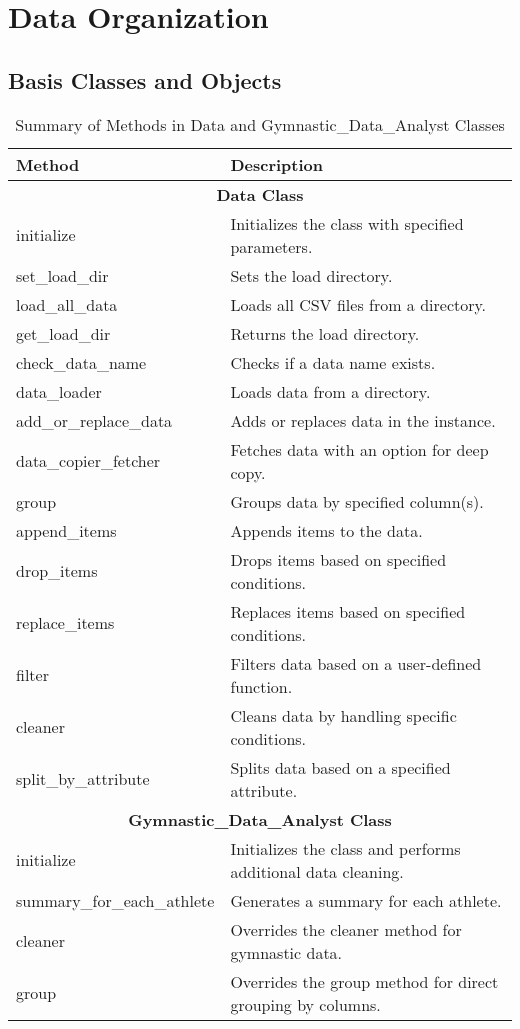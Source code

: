 \documentclass{article}
\theoremstyle{roman}
\begin{document}
\section{Data Organization}
\subsection{Basis Classes and Objects}
\begin{table}[h]
  \centering
  \begin{tabularx}{\textwidth}{lX}
    \toprule
    \textbf{Method} & \textbf{Description} \\
    \midrule
    \multicolumn{2}{c}{\textbf{Data Class}} \\
    \midrule
    initialize & Initializes the class with specified parameters. \\
    set\_load\_dir & Sets the load directory. \\
    load\_all\_data & Loads all CSV files from a directory. \\
    get\_load\_dir & Returns the load directory. \\
    check\_data\_name & Checks if a data name exists. \\
    data\_loader & Loads data from a directory. \\
    add\_or\_replace\_data & Adds or replaces data in the instance. \\
    data\_copier\_fetcher & Fetches data with an option for deep copy. \\
    group & Groups data by specified column(s). \\
    append\_items & Appends items to the data. \\
    drop\_items & Drops items based on specified conditions. \\
    replace\_items & Replaces items based on specified conditions. \\
    filter & Filters data based on a user-defined function. \\
    cleaner & Cleans data by handling specific conditions. \\
    split\_by\_attribute & Splits data based on a specified attribute. \\
    \midrule
    \multicolumn{2}{c}{\textbf{Gymnastic\_Data\_Analyst Class}} \\
    \midrule
    initialize & Initializes the class and performs additional data cleaning. \\
    summary\_for\_each\_athlete & Generates a summary for each athlete. \\
    cleaner & Overrides the cleaner method for gymnastic data. \\
    group & Overrides the group method for direct grouping by columns. \\
    \bottomrule
  \end{tabularx}
  \caption{Summary of Methods in Data and Gymnastic\_Data\_Analyst Classes}
  \label{tab:methods_summary}
\end{table}
\end{document}

